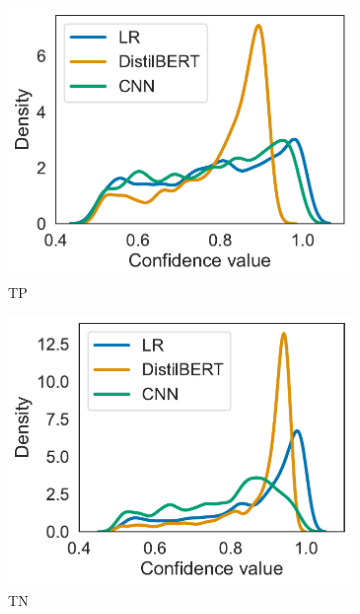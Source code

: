 \begin{figure}[H]
    \centering
    \begin{subfigure}{.35\textwidth}
        \centering
        \includegraphics[scale=.40]{Figures/confidence-densities-unseen-tp.pdf}
        \caption{TP}
    \end{subfigure}
    \begin{subfigure}{.35\textwidth}
        \centering
        \includegraphics[scale=.40]{Figures/confidence-densities-unseen-tn.pdf}
        \caption{TN}
    \end{subfigure}
    \begin{subfigure}{.35\textwidth}

\end{subfigure}
\end{figure}
